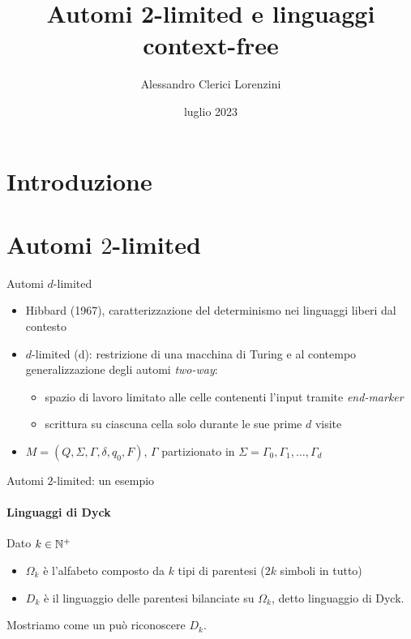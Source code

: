 \documentclass{beamer}
\title{Automi 2-limited e linguaggi context-free}
\author{Alessandro Clerici Lorenzini}
\date{luglio 2023}
\institute{Seminario per l'esame di Teoria dei Linguaggi @ Unimi}
\begin{document}
\maketitle


\section{Introduzione}


\section{Automi \texorpdfstring{$2$}{2}-limited}
\begin{frame}{Automi $d$-limited}
	\begin{itemize}
		\item Hibbard (1967), caratterizzazione del determinismo nei linguaggi liberi dal contesto
		\item $d$-limited (\la d): restrizione di una macchina di Turing e al contempo generalizzazione degli automi \emph{two-way}:
		      \begin{itemize}
			      \item spazio di lavoro limitato alle celle contenenti l'input tramite \emph{end-marker}
			      \item scrittura su ciascuna cella solo durante le sue prime $d$ visite
		      \end{itemize}
		\item $M=(Q,\Sigma,\Gamma,\delta,q_0,F)$, $\Gamma$ partizionato in $\Sigma=\Gamma_0,\Gamma_1,\dots,\Gamma_d$
	\end{itemize}

	\vfill
	\begin{figure}
		\centering
		
	\end{figure}
\end{frame}

\begin{frame}{Automi $2$-limited: un esempio}
	\framesubtitle{Linguaggi di Dyck}
	Dato $k\in\mathbb N^+$
	\begin{itemize}
		\item $\Omega_k$ è l'alfabeto composto da $k$ tipi di parentesi ($2k$ simboli in tutto)
		\item $D_k$ è il linguaggio delle parentesi bilanciate su $\Omega_k$, detto linguaggio di Dyck.
	\end{itemize}
	\vspace{1cm}
	Mostriamo come un  può riconoscere $D_k$.
\end{frame}
\end{document}
